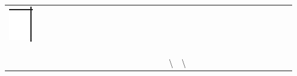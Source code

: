 \documentclass[10pt]{article}
\begin{document}
\begin{center}
\begin{tabular}{|c|c|c|c|c|c|c|c|c|c|c|c|c|c|c|c|c|c|c|c|c|c|c|c|c|c|c|c|c|c|}
 &  &  &  &  &  &  &  &  &  &  &  &  &  &  &  &  &  &  &  &  &  &  &  &  &  &  &  &  &  \\
\hline
\includegraphics[max width=\textwidth]{2024_11_21_8206013b40ecc9b11a30g-11(1)}
 &  &  &  &  &  &  &  &  &  &  &  &  &  &  &  &  &  &  &  &  &  &  &  &  &  &  &  &  &  \\
\hline
 &  &  &  &  &  &  &  &  &  &  &  &  &  &  &  &  &  &  &  &  &  &  &  &  &  &  &  &  &  \\
\hline
 &  &  &  &  &  &  &  &  &  &  &  &  &  &  &  &  &  &  &  &  &  &  &  &  &  &  &  &  &  \\
\hline
 &  &  &  &  &  &  &  &  &  &  &  &  &  &  &  &  &  &  &  &  &  &  &  &  &  &  &  &  &  \\
\hline
 &  &  &  &  &  &  &  &  &  &  &  &  &  &  &  & \textbackslash  & \textbackslash  &  &  &  &  &  &  &  &  &  &  &  &  \\

\end{tabular}
\end{center}
\end{document}
